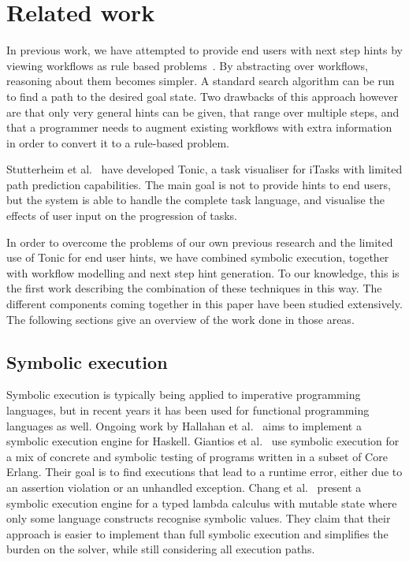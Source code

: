 
\section{Related work}
\label{sec:relatedwork}

In previous work, we have attempted to provide end users with next step hints by viewing workflows as rule based problems~\cite{DBLP:conf/sfp/NausJ16}.
By abstracting over workflows, reasoning about them becomes simpler.
A standard search algorithm can be run to find a path to the desired goal state.
Two drawbacks of this approach however are that only very general hints can be given, that range over multiple steps, and that a programmer needs to augment existing workflows with extra information in order to convert it to a rule-based problem.

Stutterheim et al.~\cite{DBLP:conf/sfp/StutterheimPA14} have developed Tonic, a task visualiser for iTasks with limited path prediction capabilities.
The main goal is not to provide hints to end users, but the system is able to handle the complete task language, and visualise the effects of user input on the progression of tasks.

In order to overcome the problems of our own previous research and the limited use of Tonic for end user hints, we have combined symbolic execution, together with workflow modelling and next step hint generation.
To our knowledge, this is the first work describing the combination of these techniques in this way.
The different components coming together in this paper have been studied extensively.
The following sections give an overview of the work done in those areas.


\subsection{Symbolic execution}

Symbolic execution \cite{King1975,Boyer1975} is typically being applied to imperative programming languages,
but in recent years it has been used for functional programming languages as well.
Ongoing work by Hallahan et al.~\cite{HallahanXP2017,DBLP:conf/pldi/HallahanXBJP19} aims to implement a symbolic execution engine for Haskell.
Giantios et al.~\cite{GiantsiosPS2017} use symbolic execution for a mix of concrete and symbolic testing of programs written in a subset of Core Erlang.
Their goal is to find executions that lead to a runtime error, either due to an assertion violation or an unhandled exception.
Chang et al.~\cite{ChangKT2018} present a symbolic execution engine for a typed lambda calculus with mutable state where only some language constructs recognise symbolic values.
They claim that their approach is easier to implement than full symbolic execution and simplifies the burden on the solver, while still considering all execution paths.



